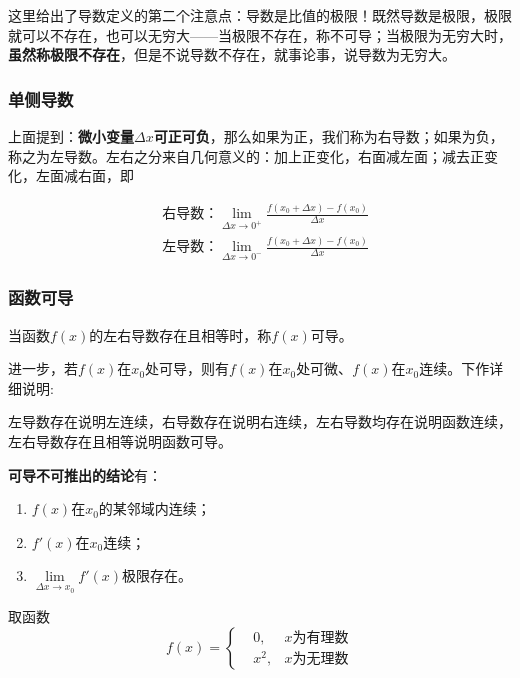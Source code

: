 \begin{remark}
	这里给出了导数定义的第二个注意点：导数是比值的极限！既然导数是极限，极限就可以不存在，也可以无穷大——当极限不存在，称不可导；当极限为无穷大时，\textbf{虽然称极限不存在}，但是不说导数不存在，就事论事，说导数为无穷大。
\end{remark}

\subsubsection{单侧导数}\label{sec:1.1.2.2}

上面提到：\textbf{微小变量$\Delta x$可正可负}，那么如果为正，我们称为右导数；如果为负，称之为左导数。左右之分来自几何意义的：加上正变化，右面减左面；减去正变化，左面减右面，即

\begin{align*}
	&\text{右导数：}\underset{\Delta x\rightarrow 0^+}{\lim}\frac{f(x_0+\Delta x)-f(x_0)}{\Delta x}\\
	&\text{左导数：}\underset{\Delta x\rightarrow 0^-}{\lim}\frac{f(x_0+\Delta x)-f(x_0)}{\Delta x}
\end{align*}

\subsubsection{函数可导}

\begin{theorem}
	当函数$f(x)$的左右导数存在且相等时，称$f(x)$可导。
\end{theorem}

进一步，若$f(x)$在$x_0$处可导，则有$f(x)$在$x_0$处可微、$f(x)$在$x_0$连续。下作详细说明:

左导数存在说明左连续，右导数存在说明右连续，左右导数均存在说明函数连续，左右导数存在且相等说明函数可导。

\textbf{可导不可推出的结论}有：

\begin{enumerate}
	\item $f(x)$在$x_0$的某邻域内连续；
	\item $f'(x)$在$x_0$连续；
	\item $\underset{\Delta x\rightarrow x_0}{\lim}f'(x)$极限存在。
\end{enumerate}

取函数
$$ f(x)=\left\{
\begin{aligned}
	&0,&\text{$x$为有理数}\\
	&x^2,&\text{$x$为无理数}
\end{aligned}
\right.
$$


